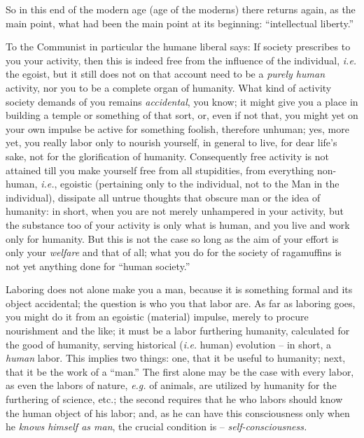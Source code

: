 So in this end of the modern age (age of the moderns) there returns again, as 
the main point, what had been the main point at its beginning: ``intellectual 
liberty.''

To the Communist in particular the humane liberal says: If society prescribes 
to you your activity, then this is indeed free from the influence of the 
individual, \textit{i.e.} the egoist, but it still does not on that account 
need to be a \textit{purely human} activity, nor you to be a complete organ of 
humanity. What kind of activity society demands of you remains 
\textit{accidental}, you know; it might give you a place in building a temple 
or something of that sort, or, even if not that, you might yet on your own 
impulse be active for something foolish, therefore unhuman; yes, more yet, you 
really labor only to nourish yourself, in general to live, for dear life's 
sake, not for the glorification of humanity. Consequently free activity is not 
attained till you make yourself free from all stupidities, from everything 
non-human, \textit{i.e.}, egoistic (pertaining only to the individual, not to 
the Man in the individual), dissipate all untrue thoughts that obscure man or 
the idea of humanity: in short, when you are not merely unhampered in your 
activity, but the substance too of your activity is only what is human, and 
you live and work only for humanity. But this is not the case so long as the 
aim of your effort is only your \textit{welfare} and that of all; what you do 
for the society of ragamuffins is not yet anything done for ``human 
society.''

Laboring does not alone make you a man, because it is something formal and its 
object accidental; the question is who you that labor are. As far as laboring 
goes, you might do it from an egoistic (material) impulse, merely to procure 
nourishment and the like; it must be a labor furthering humanity, calculated 
for the good of humanity, serving historical (\textit{i.e.} human) evolution 
-- in short, a \textit{human} labor. This implies two things: one, that it be 
useful to humanity; next, that it be the work of a ``man.'' The first alone 
may be the case with every labor, as even the labors of nature, \textit{e.g.} 
of animals, are utilized by humanity for the furthering of science, etc.; the 
second requires that he who labors should know the human object of his labor; 
and, as he can have this consciousness only when he \textit{knows himself as 
man}, the crucial condition is -- \textit{self-consciousness.}

